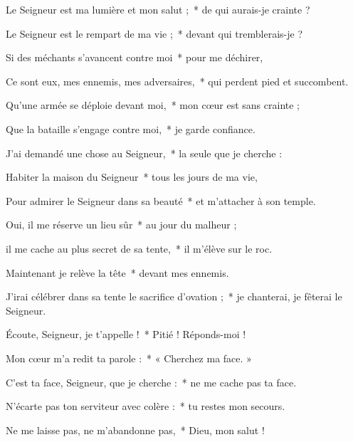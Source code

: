 \item Le Seigneur est ma lumière et mon salut ;~* de qui aurais-je crainte ?

\item Le Seigneur est le rempart de ma vie ;~* devant qui tremblerais-je ?

\item Si des méchants s'avancent contre moi~* pour me déchirer,

\item Ce sont eux, mes ennemis, mes adversaires,~* qui perdent pied et succombent.

\item Qu'une armée se déploie devant moi,~* mon cœur est sans crainte ;

\item Que la bataille s'engage contre moi,~* je garde confiance.

\item J'ai demandé une chose au Seigneur,~* la seule que je cherche :

\item Habiter la maison du Seigneur~* tous les jours de ma vie,

\item Pour admirer le Seigneur dans sa beauté~* et m'attacher à son temple.

\item Oui, il me réserve un lieu sûr~* au jour du malheur ;

\item il me cache au plus secret de sa tente,~* il m'élève sur le roc.

\item Maintenant je relève la tête~* devant mes ennemis.

\item J'irai célébrer dans sa tente le sacrifice d'ovation ;~* je chanterai, je fêterai le Seigneur.

\item Écoute, Seigneur, je t'appelle !~* Pitié ! Réponds-moi !

\item Mon cœur m'a redit ta parole :~* « Cherchez ma face. »

\item C'est ta face, Seigneur, que je cherche :~* ne me cache pas ta face.

\item N'écarte pas ton serviteur avec colère :~* tu restes mon secours.

\item Ne me laisse pas, ne m'abandonne pas,~* Dieu, mon salut !

